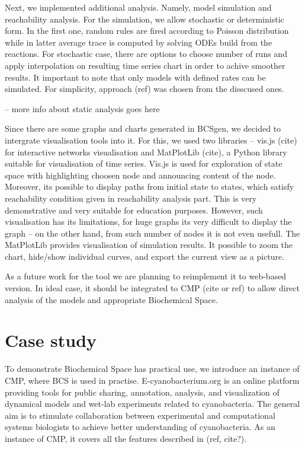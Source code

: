 \documentclass[12pt]{fithesis2}
\begin{document}
Next, we implemented additional analysis. Namely, model simulation and reachability analysis. For the simulation, we allow stochastic or deterministic form. In the first one, random rules are fired according to Poisson distribution while in latter average trace is computed by solving ODEs build from the reactions. For stochastic case, there are options to choose number of runs and apply interpolation on resulting time series chart in order to achive smoother results. It important to note that only models with defined rates can be simulated. For simplicity, approach (ref) was chosen from the disscused ones.

 -- more info about static analysis goes here

Since there are some graphs and charts generated in BCSgen, we decided to intergrate visualisation tools into it. For this, we used two libraries -- vis.js (cite) for interactive networks visualisation and MatPlotLib (cite), a Python library suitable for visualisation of time series. Vis.js is used for exploration of state space with highlighting choosen node and announcing content of the node. Moreover, its possible to display paths from initial state to states, which satisfy reachability condition given in reachability analysis part. This is very demonstrative and very suitable for education purposes. However, such visualisation has its limitations, for huge graphs its very difficult to display the graph -- on the other hand, from such number of nodes it is not even usefull. The MatPlotLib provides visualisation of simulation results. It possible to zoom the chart, hide/show individual curves, and export the current view as a picture.

As a future work for the tool we are planning to reimplement it to web-based version. In ideal case, it should be integrated to CMP (cite or ref) to allow direct analysis of the models and appropriate Biochemical Space.  

\chapter{Case study}

To demonstrate Biochemical Space has practical use, we introduce an instance of CMP, where BCS is used in practise. E-cyanobacterium.org is an online platform providing tools for public sharing, annotation, analysis, and visualization of dynamical models and wet-lab experiments related to cyanobacteria. The general aim is to stimulate collaboration between experimental and computational systems biologists to achieve better understanding of cyanobacteria. As an instance of CMP, it covers all the features described in (ref, cite?).
\end{document}
